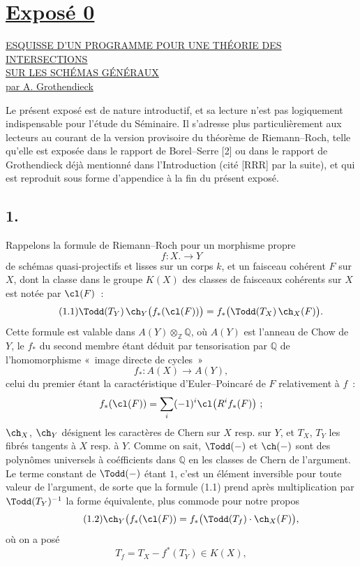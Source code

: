 \section*{\underline{Exposé 0}}
\begin{center}
\underline{\underline{ESQUISSE D'UN PROGRAMME POUR UNE THÉORIE DES INTERSECTIONS}}\\[3pt]
\underline{\underline{SUR LES SCHÉMAS GÉNÉRAUX}}\\[8pt]
\underline{par A. Grothendieck}
\end{center}

Le présent exposé est de nature introductif, et sa lecture n'est pas logiquement indispensable pour l'étude du Séminaire. Il s'adresse plus particulièrement aux lecteurs au courant de la version provisoire du théorème de Riemann--Roch, telle qu'elle est exposée dans le rapport de Borel--Serre [2] ou dans le rapport de Grothendieck déjà mentionné dans l'Introduction (cité [RRR] par la suite), et qui est reproduit sous forme d'appendice à la fin du présent exposé.

\subsection*{1.}
Rappelons la formule de Riemann--Roch pour un morphisme propre
\[
f:X.\longrightarrow Y
\]
de schémas quasi-projectifs et lisses sur un corps $k$, et un faisceau cohérent $F$ sur $X$, dont la classe dans le groupe $K(X)$ des classes de faisceaux cohérents sur $X$ est notée par $\cl(F)$~:
\begin{equation}\tag{1.1}
\Todd(T_Y)\,\ch_Y\bigl(f_*(\cl(F))\bigr)=f_*\bigl(\Todd(T_X)\,\ch_X(F)\bigr).
\end{equation}
Cette formule est valable dans $A(Y)\otimes_{\mathbb Z}\mathbb Q$, où $A(Y)$ est l'anneau de Chow de $Y$, le $f_*$ du second membre étant déduit par tensorisation par $\mathbb Q$ de l'homomorphisme «~image directe de cycles~»
\[
f_*:A(X)\longrightarrow A(Y),
\]
celui du premier étant la caractéristique d'Euler--Poincaré de $F$ relativement à $f$~:
\[
f_*(\cl(F))=\sum_i(-1)^i\cl\bigl(R^if_*(F)\bigr)~;
\]
$\ch_X$, $\ch_Y$ désignent les caractères de Chern sur $X$ resp. sur $Y$, et $T_X$, $T_Y$ les fibrés tangents à $X$ resp. à $Y$. Comme on sait, $\Todd(-)$ et $\ch(-)$ sont des polynômes universels à coéfficients dans $\mathbb Q$ en les classes de Chern de l'argument. Le terme constant de $\Todd(-)$ étant $1$, c'est un élément inversible pour toute valeur de l'argument, de sorte que la formule (1.1) prend après multiplication par $\Todd(T_Y)^{-1}$ la forme équivalente, plus commode pour notre propos
\begin{equation}\tag{1.2}
\ch_Y\bigl(f_*(\cl(F))=f_*\bigl(\Todd(T_f)\cdot\ch_X(F)\bigr),
\end{equation}
où on a posé
\begin{equation}\tag{1.3}
T_f=T_X-f^*(T_Y)\in K(X),
\end{equation}

